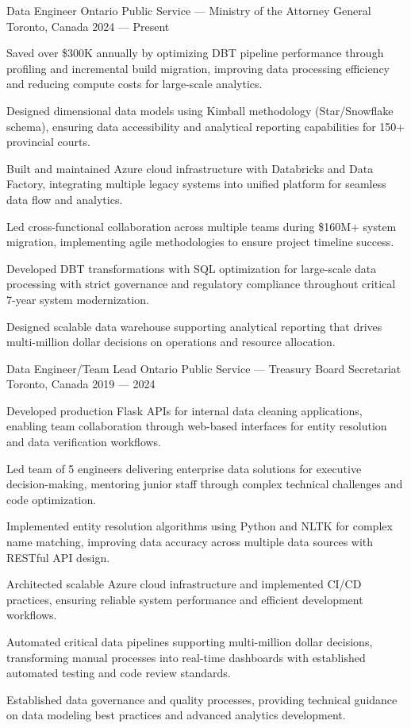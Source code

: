 \begin{cventries}

\cventry%
	{Data Engineer}
	{Ontario Public Service --- Ministry of the Attorney General}
	{Toronto, Canada}
	{2024 --- Present}
	{
		\begin{cvitems}
			\item Saved over \$300K annually by optimizing DBT pipeline performance through profiling and incremental build migration, improving data processing efficiency and reducing compute costs for large-scale analytics.
			\item Designed dimensional data models using Kimball methodology (Star/Snowflake schema), ensuring data accessibility and analytical reporting capabilities for 150+ provincial courts.
			\item Built and maintained Azure cloud infrastructure with Databricks and Data Factory, integrating multiple legacy systems into unified platform for seamless data flow and analytics.
			\item Led cross-functional collaboration across multiple teams during \$160M+ system migration, implementing agile methodologies to ensure project timeline success.
			\item Developed DBT transformations with SQL optimization for large-scale data processing with strict governance and regulatory compliance throughout critical 7-year system modernization.\item Designed scalable data warehouse supporting analytical reporting that drives multi-million dollar decisions on operations and resource allocation.
		\end{cvitems}
	}

\cventry%
	{Data Engineer/Team Lead}
	{Ontario Public Service --- Treasury Board Secretariat}
	{Toronto, Canada}
	{2019 --- 2024}
	{
		\begin{cvitems}
			\item Developed production Flask APIs for internal data cleaning applications, enabling team collaboration through web-based interfaces for entity resolution and data verification workflows.
			\item Led team of 5 engineers delivering enterprise data solutions for executive decision-making, mentoring junior staff through complex technical challenges and code optimization.
			\item Implemented entity resolution algorithms using Python and NLTK for complex name matching, improving data accuracy across multiple data sources with RESTful API design.
			\item Architected scalable Azure cloud infrastructure and implemented CI/CD practices, ensuring reliable system performance and efficient development workflows.
			\item Automated critical data pipelines supporting multi-million dollar decisions, transforming manual processes into real-time dashboards with established automated testing and code review standards.
			\item Established data governance and quality processes, providing technical guidance on data modeling best practices and advanced analytics development.
		\end{cvitems}
	}


\end{cventries}
